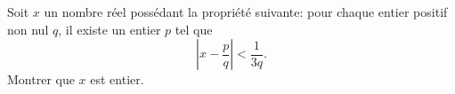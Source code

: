 \documentclass[varwidth]{standalone}
\begin{document}
    Soit $x$ un nombre r\'eel poss\'edant la propri\'et\'e suivante: pour chaque entier positif non nul $q$, il existe un entier $p$ tel que
    \[
        \left| x - \frac{p}{q} \right| < \frac{1}{3q}.  
    \]
    Montrer que $x$ est entier.
\end{document}
